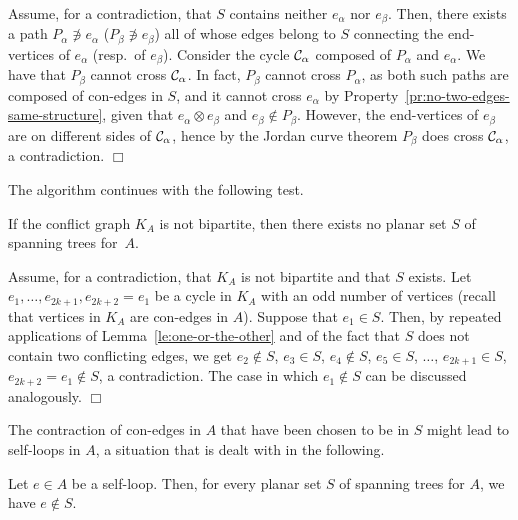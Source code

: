 \documentclass[letter,runningheads]{llncs}
\renewenvironment{proof}
{{\em Proof.\ }}{\hspace*{\fill}$\Box$\par\vspace{2mm}}
\newcommand{\conf}{\otimes}
\begin{document}
\begin{proof}
Assume, for a contradiction, that $S$ contains neither $e_{\alpha}$ nor $e_{\beta}$. Then, there exists a path $P_{\alpha}\not\ni e_{\alpha}$ ($P_{\beta}\not\ni e_{\beta}$) all of whose edges belong to $S$ connecting the end-vertices of $e_{\alpha}$ (resp.\ of $e_{\beta}$). Consider the cycle ${\cal C}_{\alpha}$ composed of $P_{\alpha}$ and $e_{\alpha}$. We have that $P_{\beta}$ cannot cross  ${\cal C}_{\alpha}$. In fact, $P_{\beta}$ cannot cross $P_{\alpha}$, as both such paths are composed of con-edges in $S$, and it cannot cross $e_{\alpha}$ by Property~\ref{pr:no-two-edges-same-structure}, given that $e_{\alpha}\conf e_{\beta}$ and $e_{\beta}\notin P_{\beta}$. However, the end-vertices of $e_{\beta}$ are on different sides of ${\cal C}_{\alpha}$, hence by the Jordan curve theorem $P_{\beta}$ does cross ${\cal C}_{\alpha}$, a contradiction.
\end{proof}



The algorithm continues with the following test.


\begin{lemma}[{\sc Test 2}]\label{le:conflicts-are-bipartite}
If the conflict graph $K_A$ is not bipartite, then there exists no planar set $S$ of spanning trees for~$A$.
\end{lemma}

\begin{proof}
Assume, for a contradiction, that $K_A$ is not bipartite and that $S$ exists. Let $e_1, \dots, e_{2k+1},e_{2k+2}=e_1$ be a cycle in $K_A$ with an odd number of vertices (recall that vertices in $K_A$ are con-edges in $A$). Suppose that $e_1\in S$. Then, by repeated applications of Lemma~\ref{le:one-or-the-other} and of the fact that $S$ does not contain two conflicting edges, we get $e_2\notin S$, $e_3\in S$, $e_4\notin S$, $e_5\in S$, $\dots$, $e_{2k+1}\in S$, $e_{2k+2}=e_1\notin S$, a contradiction. The case in which $e_1\notin S$ can be discussed analogously.
\end{proof}



The contraction of con-edges in $A$ that have been chosen to be in $S$ might lead to self-loops in $A$, a situation that is dealt with in the following.
\begin{lemma}[{\sc Simplification 2}]\label{le:self-loop}
Let $e\in A$ be a self-loop. Then, for every planar set $S$ of spanning trees for $A$, we have $e\notin S$.
\end{lemma}
\end{document}
